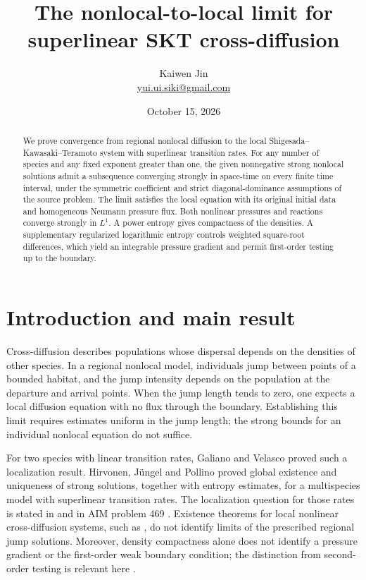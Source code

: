 \documentclass[11pt]{article}
\title{The nonlocal-to-local limit for superlinear SKT cross-diffusion}
\author{Kaiwen Jin\\\small\href{mailto:yui.ui.siki@gmail.com}{yui.ui.siki@gmail.com}}
\date{October 15, 2026}
\begin{document}
\maketitle
\begin{abstract}
We prove convergence from regional nonlocal diffusion to the local
Shigesada--Kawasaki--Teramoto system with superlinear transition rates.
For any number of species and any fixed exponent greater than one, the given
nonnegative strong nonlocal solutions admit a subsequence converging strongly
in space-time on every finite time interval, under the symmetric coefficient
and strict diagonal-dominance assumptions of the source problem.
The limit satisfies the local equation with its original initial data and
homogeneous Neumann pressure flux. Both nonlinear pressures and reactions
converge strongly in $L^1$.
A power entropy gives compactness of the densities. A supplementary
regularized logarithmic entropy controls weighted square-root differences,
which yield an integrable pressure gradient and permit first-order testing
up to the boundary.
\end{abstract}

\section{Introduction and main result}\label{sec:intro}

Cross-diffusion describes populations whose dispersal depends on the densities
of other species. In a regional nonlocal model, individuals jump between points
of a bounded habitat, and the jump intensity depends on the population at the
departure and arrival points. When the jump length tends to zero, one expects
a local diffusion equation with no flux through the boundary. Establishing this
limit requires estimates uniform in the jump length; the strong bounds for an
individual nonlocal equation do not suffice.

For two species with linear transition rates, Galiano and Velasco
\cite[Theorem 1]{GV} proved such a localization result. Hirvonen, J\"ungel and
Pollino \cite[Theorems 1 and 2]{HJP} proved global existence and uniqueness of
strong solutions, together with entropy estimates, for a multispecies model
with superlinear transition rates. The
localization question for those rates is stated in \cite[Section 1.1]{HJP}
and in AIM problem 469 \cite{AIM}. Existence theorems for local nonlinear
cross-diffusion systems, such as \cite[Theorem 2]{CDJ}, do not identify limits
of the prescribed regional jump solutions. Moreover, density compactness alone
does not identify a pressure gradient or the first-order weak boundary
condition; the distinction from second-order testing is relevant here
\cite[Remark 16]{CDJ}.
\end{document}
